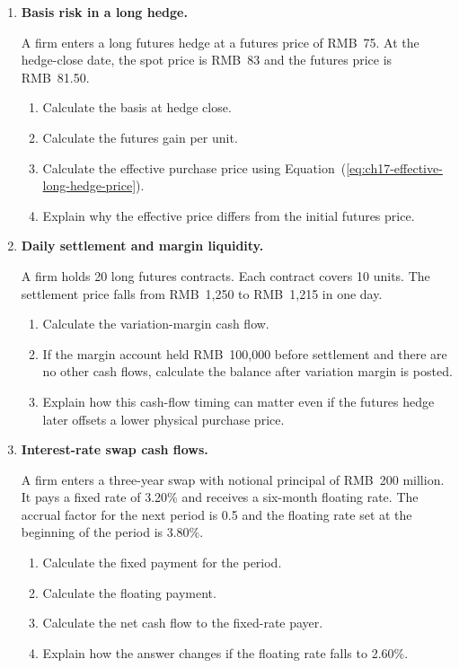 \begin{enumerate}
\item \textbf{Basis risk in a long hedge.}

A firm enters a long futures hedge at a futures price of RMB~75. At the hedge-close date, the spot price is RMB~83 and the futures price is RMB~81.50.

\begin{enumerate}
\item Calculate the basis at hedge close.
\item Calculate the futures gain per unit.
\item Calculate the effective purchase price using Equation~(\ref{eq:ch17-effective-long-hedge-price}).
\item Explain why the effective price differs from the initial futures price.
\end{enumerate}

\item \textbf{Daily settlement and margin liquidity.}

A firm holds 20 long futures contracts. Each contract covers 10 units. The settlement price falls from RMB~1,250 to RMB~1,215 in one day.

\begin{enumerate}
\item Calculate the variation-margin cash flow.
\item If the margin account held RMB~100,000 before settlement and there are no other cash flows, calculate the balance after variation margin is posted.
\item Explain how this cash-flow timing can matter even if the futures hedge later offsets a lower physical purchase price.
\end{enumerate}

\item \textbf{Interest-rate swap cash flows.}

A firm enters a three-year swap with notional principal of RMB~200 million. It pays a fixed rate of 3.20\% and receives a six-month floating rate. The accrual factor for the next period is 0.5 and the floating rate set at the beginning of the period is 3.80\%.

\begin{enumerate}
\item Calculate the fixed payment for the period.
\item Calculate the floating payment.
\item Calculate the net cash flow to the fixed-rate payer.
\item Explain how the answer changes if the floating rate falls to 2.60\%.
\end{enumerate}


\end{enumerate}

